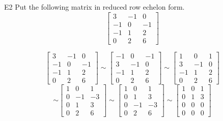 \begin{problem}{E2}
Put the following matrix in reduced row echelon form.
\[
  \begin{bmatrix}
   3 & -1 & 0 \\
   -1 & 0 & -1 \\
   -1 & 1 & 2 \\
   0 & 2 & 6
  \end{bmatrix}
\]
\end{problem}
\begin{solution}
\[
  \begin{bmatrix}
   3 & -1 & 0 \\
   -1 & 0 & -1 \\
   -1 & 1 & 2 \\
   0 & 2 & 6
  \end{bmatrix}
  \sim
  \begin{bmatrix}
   -1 & 0 & -1 \\
   3 & -1 & 0 \\
   -1 & 1 & 2 \\
   0 & 2 & 6
  \end{bmatrix}
  \sim
  \begin{bmatrix}
   1 & 0 & 1 \\
   3 & -1 & 0 \\
   -1 & 1 & 2 \\
   0 & 2 & 6
  \end{bmatrix}
\]
\[
  \sim
  \begin{bmatrix}
   1 & 0 & 1 \\
   0 & -1 & -3 \\
   0 & 1 & 3 \\
   0 & 2 & 6
  \end{bmatrix}
  \sim
  \begin{bmatrix}
   1 & 0 & 1 \\
   0 & 1 & 3 \\
   0 & -1 & -3 \\
   0 & 2 & 6
  \end{bmatrix}
  \sim
  \begin{bmatrix}
   1 & 0 & 1 \\
   0 & 1 & 3 \\
   0 & 0 & 0 \\
  0 & 0 & 0
  \end{bmatrix}
\]
\end{solution}

